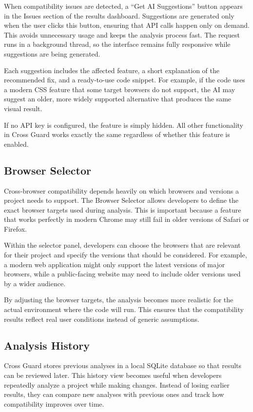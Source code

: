 When compatibility issues are detected, a ``Get AI Suggestions'' button appears in the Issues section of the results dashboard. Suggestions are generated only when the user clicks this button, ensuring that API calls happen only on demand. This avoids unnecessary usage and keeps the analysis process fast. The request runs in a background thread, so the interface remains fully responsive while suggestions are being generated.

Each suggestion includes the affected feature, a short explanation of the recommended fix, and a ready-to-use code snippet. For example, if the code uses a modern CSS feature that some target browsers do not support, the AI may suggest an older, more widely supported alternative that produces the same visual result.

If no API key is configured, the feature is simply hidden. All other functionality in Cross Guard works exactly the same regardless of whether this feature is enabled.

\subsection{Browser Selector}

Cross-browser compatibility depends heavily on which browsers and versions a project needs to support. The Browser Selector allows developers to define the exact browser targets used during analysis. This is important because a feature that works perfectly in modern Chrome may still fail in older versions of Safari or Firefox.

Within the selector panel, developers can choose the browsers that are relevant for their project and specify the versions that should be considered. For example, a modern web application might only support the latest versions of major browsers, while a public-facing website may need to include older versions used by a wider audience.

By adjusting the browser targets, the analysis becomes more realistic for the actual environment where the code will run. This ensures that the compatibility results reflect real user conditions instead of generic assumptions.

\subsection{Analysis History}

Cross Guard stores previous analyses in a local SQLite database so that results can be reviewed later. This history view becomes useful when developers repeatedly analyze a project while making changes. Instead of losing earlier results, they can compare new analyses with previous ones and track how compatibility improves over time.

